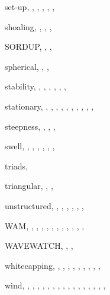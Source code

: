 \documentclass[12pt]{book}
\begin{document}
\begin{theindex}
  \item set-up, , , , 
		, , 
  \item shoaling, , , , 
  \item SORDUP, , , 
  \item spherical, , , 
  \item stability, , , , 
		, , , 
  \item stationary, , , , 
		, , , 
		, , , 
		, 
  \item steepness, , , , 
  \item swell, , , , 
		, , , 

  \indexspace

  \item triads, 
  \item triangular, , , 

  \indexspace

  \item unstructured, , , , 
		, , , 

  \indexspace

  \item WAM, , , , 
		, , , 
		, , , 
		, , 
  \item WAVEWATCH, , , 
  \item whitecapping, , , , 
		, , , 
		, , , 
  \item wind, , , , 
		, , , 
		, , , 
		, , , 
		, , , 
		, 

\end{theindex}
\end{document}
